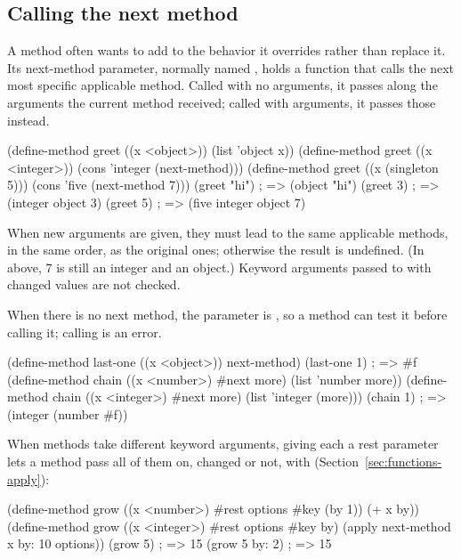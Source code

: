 \subsection{Calling the next method}\label{sec:functions-next-method}

A method often wants to add to the behavior it overrides rather than
replace it. Its next-method parameter, normally named ,
holds a function that calls the next most specific applicable method. Called
with no arguments, it passes along the arguments the current method
received; called with arguments, it passes those instead.

\begin{dylan}
(define-method greet ((x <object>)) (list 'object x))
(define-method greet ((x <integer>)) (cons 'integer (next-method)))
(define-method greet ((x (singleton 5))) (cons 'five (next-method 7)))
(greet "hi")                   ; => (object "hi")
(greet 3)                      ; => (integer object 3)
(greet 5)                      ; => (five integer object 7)
\end{dylan}

\noindent When new arguments are given, they must lead to the same
applicable methods, in the same order, as the original ones; otherwise the
result is undefined. (In  above, 7 is still an integer and an
object.) Keyword arguments passed to  with changed values
are not checked.

When there is no next method, the parameter is , so a method can
test it before calling it; calling  is an error.

\begin{dylan}
(define-method last-one ((x <object>)) next-method)
(last-one 1)                   ; => #f
(define-method chain ((x <number>) #next more) (list 'number more))
(define-method chain ((x <integer>) #next more) (list 'integer (more)))
(chain 1)                      ; => (integer (number #f))
\end{dylan}

\noindent When methods take different keyword arguments, giving each a rest
parameter lets a method pass all of them on, changed or not, with
 (Section~\ref{sec:functions-apply}):

\begin{dylan}
(define-method grow ((x <number>) #rest options #key (by 1))
  (+ x by))
(define-method grow ((x <integer>) #rest options #key by)
  (apply next-method x by: 10 options))
(grow 5)                       ; => 15
(grow 5 by: 2)                 ; => 15
\end{dylan}

